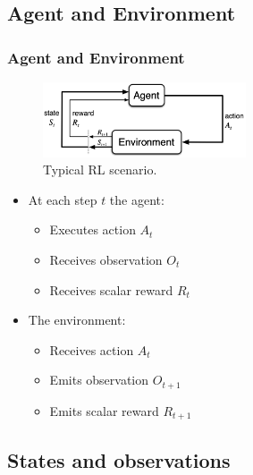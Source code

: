 \documentclass[10pt]{beamer}
\begin{document}
\subsection{Agent and Environment}

\begin{frame}
\frametitle{Agent and Environment}


\begin{multicols}{2}
	
	\begin{figure}
		\centering
		\includegraphics[width=6cm]{rl-loop.png}
		\caption{Typical RL scenario. \cite{10.5555/3312046}}
		\label{fig:rl-loop}
	\end{figure}
	
	\columnbreak

	\begin{itemize}
		\item At each step $t$ the agent:
		\begin{itemize}
			\item Executes action $A_t$
			\item Receives observation $O_t$
			\item Receives scalar reward $R_t$
		\end{itemize}
	
		\item The environment:
		\begin{itemize}
			\item Receives action $A_t$
			\item Emits observation $O_{t+1}$
			\item Emits scalar reward $R_{t+1}$
		\end{itemize}
	\end{itemize}

\end{multicols}


\end{frame}

\subsection{States and observations}
\end{document}
